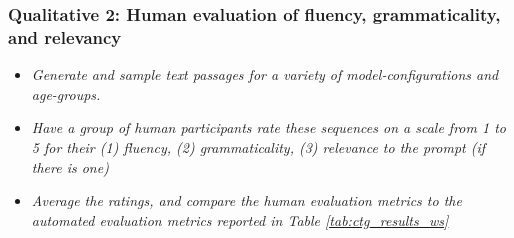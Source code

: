 \subsubsection{Qualitative 2: Human evaluation of fluency, grammaticality, and relevancy}

\begin{itemize}
    \item \textit{Generate and sample text passages for a variety of model-configurations and age-groups.}
    \item \textit{Have a group of human participants rate these sequences on a scale from 1 to 5 for their (1) fluency, (2) grammaticality, (3) relevance to the prompt (if there is one)}
    \item \textit{Average the ratings, and compare the human evaluation metrics to the automated evaluation metrics reported in Table \ref{tab:ctg_results_ws}}
\end{itemize}



